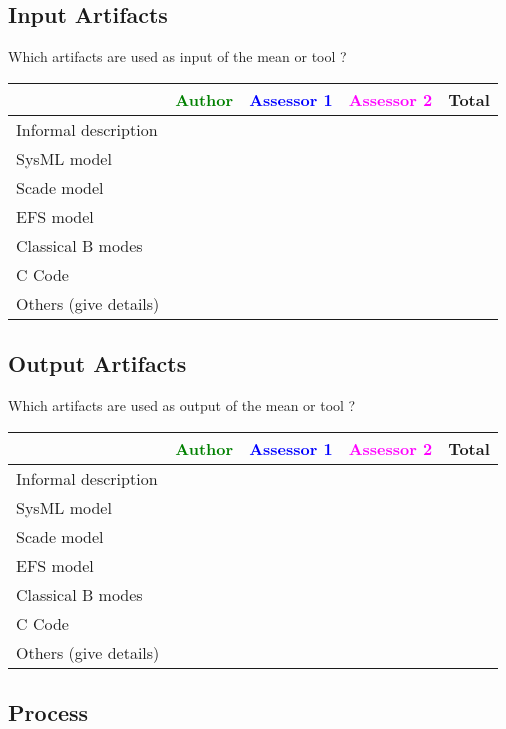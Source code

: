 \subsection{Input Artifacts}

Which artifacts are used as input of the mean or tool  ? 


\begin{tabular}{|l | c | c | c | c|}
\hline
& \textcolor{green}{Author} & \textcolor{blue}{Assessor 1} & \textcolor{magenta}{Assessor 2} & Total \\
\hline 
Informal description & & & &  \\
\hline
SysML model & & & & \\
\hline
Scade model & & & & \\
\hline
EFS model & & & & \\
\hline
Classical B modes & & & &  \\
\hline
C Code & & & & \\
\hline
Others (give details) & & & & \\
\hline
\end{tabular}



\subsection{Output Artifacts}

Which artifacts are used as output of the mean or tool  ? 


\begin{tabular}{|l | c | c | c | c|}
\hline
& \textcolor{green}{Author} & \textcolor{blue}{Assessor 1} & \textcolor{magenta}{Assessor 2} & Total \\
\hline 
Informal description & & & &  \\
\hline
SysML model & & & & \\
\hline
Scade model & & & & \\
\hline
EFS model & & & & \\
\hline
Classical B modes & & & &  \\
\hline
C Code & & & & \\
\hline
Others (give details) & & & & \\
\hline
\end{tabular}


\subsection{Process}


